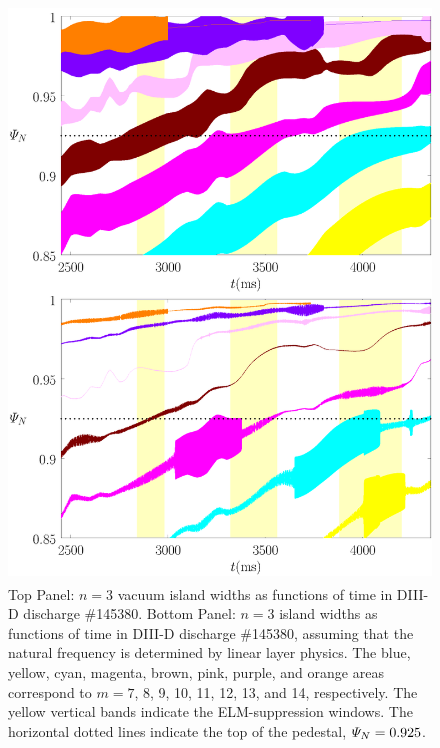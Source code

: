 \documentclass[12pt,prb,aps]{revtex4-1}
\begin{document}
\begin{figure}
\includegraphics[height=6in]{fig12.pdf}
\caption{Top Panel: $n=3$ vacuum island widths as functions of time
in   DIII-D discharge \#145380.
Bottom Panel:  $n=3$ island widths as functions of time
in   DIII-D discharge \#145380, assuming that the natural frequency is determined by linear layer physics. The blue, yellow, cyan, magenta, brown, pink,
purple, and orange  areas correspond to $m=7$, 8, 9, 10, 11, 12, 13, and 14, respectively. The yellow vertical bands indicate the ELM-suppression windows. 
The horizontal dotted lines indicate the top of the pedestal, ${\mit\Psi}_N=0.925$.} \label{fig12}
\end{figure}
\end{document}
